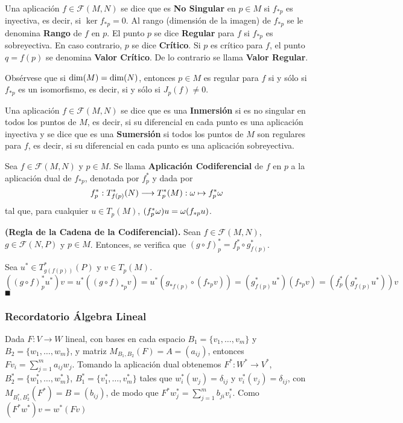 \documentclass[cursovd_portada.tex]{subfiles}
\begin{document}
\begin{defi}
Una aplicación $f\in\mathcal{F}(M,N)$ se dice que es {\bf No Singular} en $p\in M$ si $f_{*p}$ es inyectiva, es
decir, si $\ker f_{*p}=0$. Al rango (dimensión de la imagen) de $f_{*p}$ se le denomina {\bf Rango} de $f$ en $p$.
El punto $p$ se dice {\bf Regular} para $f$ si $f_{*p}$ es sobreyectiva. En caso contrario, $p$ se dice {\bf
Crítico}. Si $p$ es crítico para $f$, el punto $q=f(p)$ se denomina {\bf Valor Crítico}. De lo contrario se llama
{\bf Valor Regular}.
\end{defi}
Obsérvese que si ${\rm dim}(M)={\rm dim}(N)$, entonces $p\in M$ es regular para $f$ si y sólo si $f_{*p}$ es un
isomorfismo, es decir, si y sólo si $J_p(f)\neq 0$.
\begin{defi}
Una aplicación $f\in\mathcal{F}(M,N)$ se dice que es una {\bf Inmersión} si es no singular en todos los puntos de
$M$, es decir, si su diferencial en cada punto es una aplicación inyectiva y se dice que es una {\bf Sumersión} si
todos los puntos de $M$ son regulares para $f$, es decir, si su diferencial en cada punto es una aplicación
sobreyectiva.
\end{defi}
\begin{defi}
Sea $f\in\mathcal{F}(M,N)$ y $p\in M$. Se llama {\bf Aplicación Co\-di\-fe\-ren\-cial} de $f$ en $p$ a la
aplicación dual de $f_{*p}$, denotada por $f_p^*$ y dada por
$$f_p^*:T_{f(p)}^*(N)\longrightarrow T_p^*(M):\omega\mapsto f_p^*\omega$$
tal que, para cualquier $u\in T_p(M)$, $(f_p^*\omega)u=\omega(f_{*p}u)$.
\end{defi}
\begin{prop}
{\bf (Regla de la Cadena de la Codiferencial).} Sean $f\in\mathcal{F}(M,N)$, $g\in\mathcal{F}(N,P)$ y $p\in M$.
Entonces, se verifica que $(g\circ f)_p^*=f_p^*\circ g_{f(p)}^*$.
\end{prop}
\begin{dem}
Sea $u^*\in T^*_{g(f(p))}(P)$ y $v\in T_p(M)$.  $$((g\circ f)^*_p u^*)v=u^*((g\circ f)_{*p}v)=u^*(g_{*f(p)}\circ (f_{*p}v))=(g^*_{f(p)}u^*)(f_{*p}v)=(f^*_p(g^*_{f(p)}u^*))v$$ $\QED$
\end{dem}

\subsubsection{Recordatorio Álgebra Lineal}

Dada $F:V\to W$ lineal, con bases en cada espacio $B_1=\{v_1,\dots,v_m\}$ y $B_2=\{w_1,\dots,w_m\}$, y matriz $M_{B_1,B_2}(F)=A=(a_{ij})$, entonces $Fv_i=\sum_{j=1}^m a_{ij}w_j$. Tomando la aplicación dual obtenemos $F^*:W^*\to V^*$, $B_2^*=\{w^*_1,\dots,w^*_m\}$, $B_1^*=\{v^*_1,\dots,v^*_m\}$ tales que $w^*_i(w_j)=\delta_{ij}$ y $v^*_i(v_j)=\delta_{ij}$, con $M_{B^*_1,B^*_2}(F^*)=B=(b_{ij})$, de modo que $F^*w^*_j=\sum_{j=1}^m b_{ji}v_i^*$. Como $(F^*w^*)v=w^*(Fv)$
\end{document}
